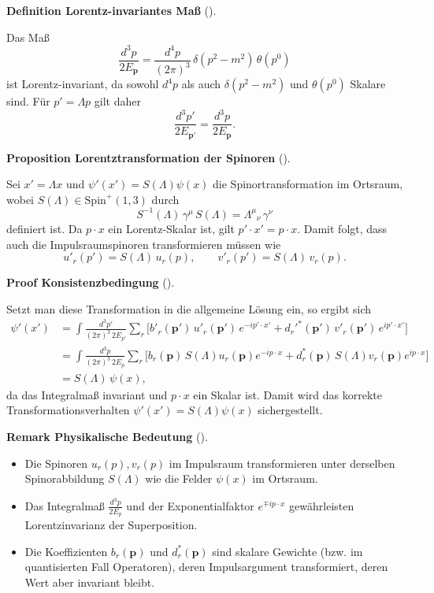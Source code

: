 \documentclass[10pt, letterpaper]{article}
\newcommand{\Spin}{\mathrm{Spin}}
\newcommand{\CustomHeading}[3]{%
  \par\medskip\noindent%
  \textbf{#1 #2} \textnormal{(#3)}.\enskip%
}
\newenvironment{DEF}[2]{\begin{unitbox}\CustomHeading{Definition}{#1}{#2}}{\end{unitbox}}
\newenvironment{PROP}[2]{\begin{unitbox}\CustomHeading{Proposition}{#1}{#2}}{\end{unitbox}}
\newenvironment{REM}[2]{\begin{unitbox}\CustomHeading{Remark}{#1}{#2}}{\end{unitbox}}
\newenvironment{PROOF}[2]{\begin{unitbox}\CustomHeading{Proof}{#1}{#2}}{\end{unitbox}}
\begin{document}
\begin{DEF}{Lorentz-invariantes Maß}{}
Das Maß
\[
\frac{d^3p}{2E_{\mathbf p}}
=\frac{d^4p}{(2\pi)^3}\,\delta(p^2-m^2)\,\theta(p^0)
\]
ist Lorentz-invariant, da sowohl $d^4p$ als auch $\delta(p^2-m^2)$ und $\theta(p^0)$ Skalare sind.  
Für $p'=\Lambda p$ gilt daher
\[
\frac{d^3p'}{2E_{\mathbf p'}}=\frac{d^3p}{2E_{\mathbf p}}.
\]
\end{DEF}

\begin{PROP}{Lorentztransformation der Spinoren}{}
Sei $x'=\Lambda x$ und $\psi'(x')=S(\Lambda)\psi(x)$ die Spinortransformation im Ortsraum, wobei $S(\Lambda)\in\Spin^+(1,3)$ durch
\[
S^{-1}(\Lambda)\,\gamma^\mu\,S(\Lambda)=\Lambda^\mu{}_\nu\,\gamma^\nu
\]
definiert ist.
Da $p\cdot x$ ein Lorentz-Skalar ist, gilt $p'\!\cdot\! x'=p\!\cdot\! x$.  
Damit folgt, dass auch die Impulsraumspinoren transformieren müssen wie
\[
\boxed{
u'_r(p')=S(\Lambda)\,u_r(p),\qquad
v'_r(p')=S(\Lambda)\,v_r(p).
}
\]
\end{PROP}

\begin{PROOF}{Konsistenzbedingung}{}
Setzt man diese Transformation in die allgemeine Lösung ein, so ergibt sich
\[
\begin{aligned}
\psi'(x')
&=\int\!\frac{d^3p'}{(2\pi)^3\,2E_{p'}}
\sum_r
\Big[b'_r(\mathbf p')\,u'_r(\mathbf p')\,e^{-ip'\cdot x'}
+d_r'^{*}(\mathbf p')\,v'_r(\mathbf p')\,e^{ip'\cdot x'}\Big]\\[4pt]
&=\int\!\frac{d^3p}{(2\pi)^3\,2E_p}\sum_r
\Big[b_r(\mathbf p)\,S(\Lambda)u_r(\mathbf p)e^{-ip\cdot x}
+d_r^*(\mathbf p)\,S(\Lambda)v_r(\mathbf p)e^{ip\cdot x}\Big]\\[4pt]
&=S(\Lambda)\,\psi(x),
\end{aligned}
\]
da das Integralmaß invariant und $p\!\cdot\!x$ ein Skalar ist.
Damit wird das korrekte Transformationsverhalten $\psi'(x')=S(\Lambda)\psi(x)$ sichergestellt.
\end{PROOF}

\begin{REM}{Physikalische Bedeutung}{}
\begin{itemize}
\item Die Spinoren $u_r(p),v_r(p)$ im Impulsraum transformieren unter derselben Spinorabbildung $S(\Lambda)$ wie die Felder $\psi(x)$ im Ortsraum.
\item Das Integralmaß $\frac{d^3p}{2E_p}$ und der Exponentialfaktor $e^{\mp i p\cdot x}$ gewährleisten Lorentzinvarianz der Superposition.
\item Die Koeffizienten $b_r(\mathbf p)$ und $d_r^*(\mathbf p)$ sind skalare Gewichte (bzw. im quantisierten Fall Operatoren), deren Impulsargument transformiert, deren Wert aber invariant bleibt.
\end{itemize}
\end{REM}
\end{document}
